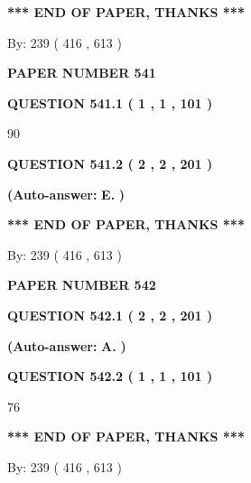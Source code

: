 \documentclass{ctexart}
\begin{document}
 
   
   
   
   
\vspace{1.0in} 
{\textbf{\large{ *** END OF PAPER, THANKS *** }}} 
   
   
\hspace{1.0in} By: 
 239 ( 416 ,  613 )
   
   
   
   
\newpage 
\setcounter{page}{ 
   541001 } 
   
   
 {\textbf{ \Large{ PAPER NUMBER  541  }}}
   
   
   
   
  
  
{\textbf{\large{QUESTION
541.1 
 ( 1 , 1 , 101 )
}}}

90
  
  
{\textbf{\large{QUESTION
541.2 
 ( 2 , 2 , 201 )
}}}
 
 
{\textbf{(Auto-answer:}}
{\textbf{\large{
E.}}}
{\textbf{)}}
 
 
   
   
   
   
\vspace{1.0in} 
{\textbf{\large{ *** END OF PAPER, THANKS *** }}} 
   
   
\hspace{1.0in} By: 
 239 ( 416 ,  613 )
   
   
   
   
\newpage 
\setcounter{page}{ 
   542001 } 
   
   
 {\textbf{ \Large{ PAPER NUMBER  542  }}}
   
   
   
   
  
  
{\textbf{\large{QUESTION
542.1 
 ( 2 , 2 , 201 )
}}}
 
 
{\textbf{(Auto-answer:}}
{\textbf{\large{
A.}}}
{\textbf{)}}
 
 
  
  
{\textbf{\large{QUESTION
542.2 
 ( 1 , 1 , 101 )
}}}

76
   
   
   
   
\vspace{1.0in} 
{\textbf{\large{ *** END OF PAPER, THANKS *** }}} 
   
   
\hspace{1.0in} By: 
 239 ( 416 ,  613 )
   
   
   
   
\newpage 
\setcounter{page}{ 
   543001 } 
   
\end{document}
